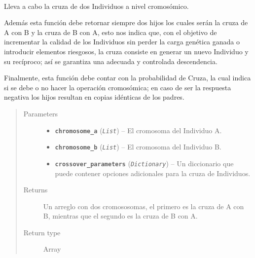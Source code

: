 \documentclass[letterpaper,10pt,english]{sphinxmanual}
\begin{document}
\begin{fulllineitems}
~
\begin{DUlineblock}{0em}
\item[] Lleva a cabo la cruza de dos Individuos a nivel cromosómico.
\item[] Además esta función debe retornar siempre dos hijos los cuales serán la cruza de A con B y
la cruza de B con A, esto nos indica que, con el objetivo de incrementar la calidad de los Individuos
sin perder la carga genética ganada o introducir elementos riesgosos, la cruza consiste en generar un
nuevo Individuo y su recíproco; así se garantiza una adecuada y controlada descendencia.
\item[] Finalmente, esta función debe contar con la probabilidad de Cruza, la cual indica si se debe o
no hacer la operación cromosómica; en caso de ser la respuesta negativa los hijos resultan en copias
idénticas de los padres.
\end{DUlineblock}
\begin{quote}\begin{description}
\item[{Parameters}] \leavevmode\begin{itemize}
\item {} 
\textbf{\texttt{chromosome\_a}} (\emph{\texttt{List}}) -- El cromosoma del Individuo A.

\item {} 
\textbf{\texttt{chromosome\_b}} (\emph{\texttt{List}}) -- El cromosoma del Individuo B.

\item {} 
\textbf{\texttt{crossover\_parameters}} (\emph{\texttt{Dictionary}}) -- Un diccionario que puede contener opciones adicionales para la
cruza de Individuos.

\end{itemize}

\item[{Returns}] \leavevmode
Un arreglo con dos cromososomas, el primero es la cruza de A con B, mientras que el segundo
es la cruza de B con A.

\item[{Return type}] \leavevmode
Array

\end{description}\end{quote}

\end{fulllineitems}
\end{document}
